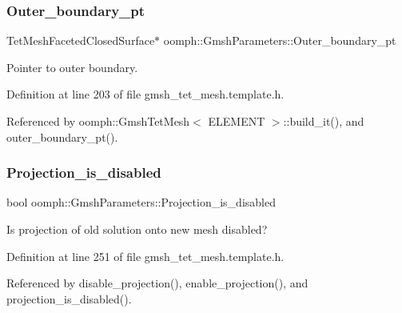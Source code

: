 \mbox{\label{classoomph_1_1GmshParameters_a310ecaffe67e67b334aafaca82c4d50a}} 
\subsubsection{\texorpdfstring{Outer\+\_\+boundary\+\_\+pt}{Outer\_boundary\_pt}}
{\footnotesize\ttfamily Tet\+Mesh\+Faceted\+Closed\+Surface$\ast$ oomph\+::\+Gmsh\+Parameters\+::\+Outer\+\_\+boundary\+\_\+pt\hspace{0.3cm}{\ttfamily [private]}}



Pointer to outer boundary. 



Definition at line 203 of file gmsh\+\_\+tet\+\_\+mesh.\+template.\+h.



Referenced by oomph\+::\+Gmsh\+Tet\+Mesh$<$ E\+L\+E\+M\+E\+N\+T $>$\+::build\+\_\+it(), and outer\+\_\+boundary\+\_\+pt().

\mbox{\label{classoomph_1_1GmshParameters_aebabc7ca82ac23e87e164655b6dc9bb4}} 
\subsubsection{\texorpdfstring{Projection\+\_\+is\+\_\+disabled}{Projection\_is\_disabled}}
{\footnotesize\ttfamily bool oomph\+::\+Gmsh\+Parameters\+::\+Projection\+\_\+is\+\_\+disabled\hspace{0.3cm}{\ttfamily [private]}}



Is projection of old solution onto new mesh disabled? 



Definition at line 251 of file gmsh\+\_\+tet\+\_\+mesh.\+template.\+h.



Referenced by disable\+\_\+projection(), enable\+\_\+projection(), and projection\+\_\+is\+\_\+disabled().

